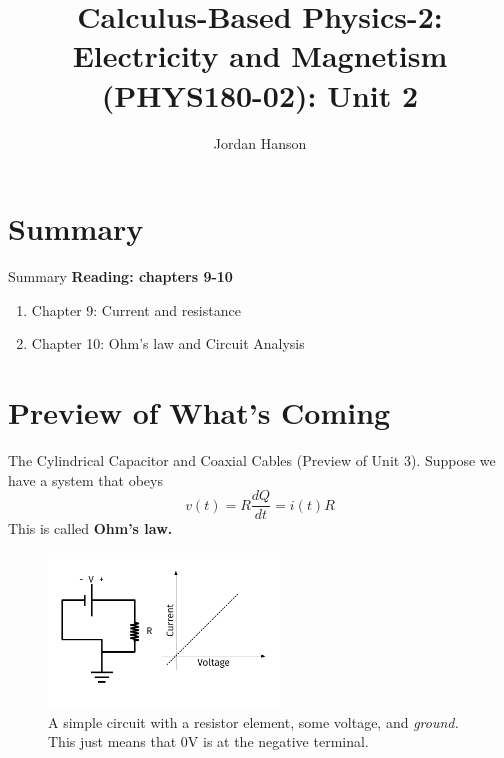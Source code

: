 \documentclass{beamer}
\title{Calculus-Based Physics-2: Electricity and Magnetism (PHYS180-02): Unit 2}
\author{Jordan Hanson}
\institute{Whittier College Department of Physics and Astronomy}
\begin{document}
\maketitle

\section{Summary}

\begin{frame}{Summary}
\textbf{Reading: chapters 9-10}
\begin{enumerate}
\item Chapter 9: Current and resistance
\item Chapter 10: Ohm's law and Circuit Analysis
\end{enumerate}
\end{frame}

\section{Preview of What's Coming}

\begin{frame}{The Cylindrical Capacitor and Coaxial Cables}
(Preview of Unit 3).  Suppose we have a system that obeys
\begin{equation}
v(t) = R \frac{dQ}{dt} = i(t) R
\end{equation}
This is called \textbf{Ohm's law.}
\begin{figure}
\centering
\includegraphics[width=0.55\textwidth]{figures/iVCurve.pdf}
\caption{\label{fig:iv} A simple circuit with a resistor element, some voltage, and \textit{ground.} This just means that 0V is at the negative terminal.}
\end{figure}
\end{frame}
\end{document}
